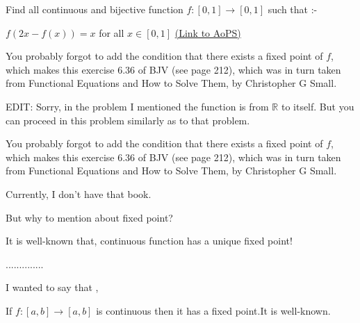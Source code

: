 \begin{problem}
	Find all continuous and bijective function $f:[0,1]\rightarrow [0,1]$ such that :-

$f(2x-f(x))=x$ for all $x\in [0,1]$
	\flushright \href{https://artofproblemsolving.com/community/c6h1587442}{(Link to AoPS)}
\end{problem}



\begin{solution}
	You probably forgot to add the condition that there exists a fixed point of $f$, which makes this exercise 6.36 of BJV (see page 212), which was in turn taken from Functional Equations and How to Solve Them, by Christopher G Small.

EDIT: Sorry, in the problem I mentioned the function is from $\mathbb{R}$ to itself. But you can proceed in this problem similarly as to that problem.
\end{solution}



\begin{solution}
	\begin{tcolorbox}You probably forgot to add the condition that there exists a fixed point of $f$, which makes this exercise 6.36 of BJV (see page 212), which was in turn taken from Functional Equations and How to Solve Them, by Christopher G Small.\end{tcolorbox}

Currently, I don't have that book.

But why to mention about fixed point?

It is well-known that, continuous function has a unique fixed point!
\end{solution}



\begin{solution}
	..............
\end{solution}



\begin{solution}
	I wanted to say that ,

If $f:[a,b]\rightarrow [a,b]$ is continuous then it has a fixed point.It is well-known.
\end{solution}



